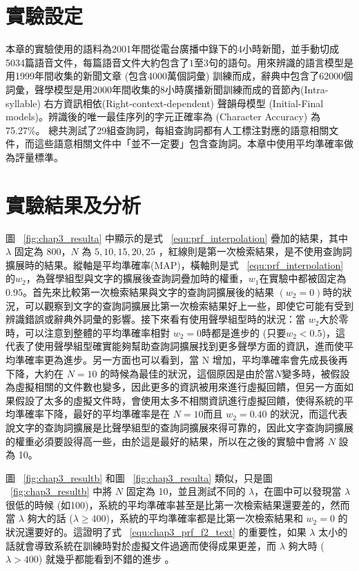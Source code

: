 \section{實驗設定}
\label{sec:chap3_exp_design} 
本章的實驗使用的語料為2001年間從電台廣播中錄下的4小時新聞，並手動切成5034篇語音文件，每篇語音文件大約包含了$1至3$句的語句。用來辨識的語言模型是用1999年間收集的新聞文章 (包含4000萬個詞彙) 訓練而成，辭典中包含了62000個詞彙，聲學模型是用2000年間收集的8小時廣播新聞訓練而成的音節內(Intra-syllable) 右方資訊相依(Right-context-dependent) 聲韻母模型 (Initial-Final models)。辨識後的唯一最佳序列的字元正確率為 (Character Accuracy) 為75.27\%。
總共測試了29組查詢詞，每組查詢詞都有人工標注對應的語意相關文件，而這些語意相關文件中「並不一定要」包含查詢詞。本章中使用平均準確率做為評量標準。

\section{實驗結果及分析}

圖 ~\ref{fig:chap3_resulta} 中顯示的是式 ~\ref{equ:prf_interpolation} 疊加的結果，其中 $\lambda$ 固定為 800，$N$ 為 $5, 10, 15, 20, 25$ ，紅線則是第一次檢索結果，是不使用查詢詞擴展時的結果。縱軸是平均準確率(MAP)，橫軸則是式 ~\ref{equ:prf_interpolation} 的$w_2$，為聲學組型與文字的擴展後查詢詞疊加時的權重，$w_1$在實驗中都被固定為 $0.95$。首先來比較第一次檢索結果與文字的查詢詞擴展後的結果 $(w_2 =
0)$時的狀況，可以觀察到文字的查詢詞擴展比第一次檢索結果好上一些，即使它可能有受到辨識錯誤或辭典外詞彙的影響。接下來看有使用聲學組型時的狀況：當 $w_2$大於零時，可以注意到整體的平均準確率相對 $w_2 = 0$時都是進步的 (只要$w_2 < 0.5$)，這代表了使用聲學組型確實能夠幫助查詢詞擴展找到更多聲學方面的資訊，進而使平均準確率更為進步。另一方面也可以看到，當 N 增加，平均準確率會先成長後再下降，大約在 $N=10$
的時候為最佳的狀況，這個原因是由於當$N$變多時，被假設為虛擬相關的文件數也變多，因此更多的資訊被用來進行虛擬回饋，但另一方面如果假設了太多的虛擬文件時，會使用太多不相關資訊進行虛擬回饋，使得系統的平均準確率下降，最好的平均準確率是在 $N=10$而且 $w_2 = 0.40$ 的狀況，而這代表說文字的查詢詞擴展是比聲學組型的查詢詞擴展來得可靠的，因此文字查詢詞擴展的權重必須要設得高一些，由於這是最好的結果，所以在之後的實驗中會將 $N$ 設為 10。

圖 ~\ref{fig:chap3_resultb} 和圖 ~\ref{fig:chap3_resulta} 類似，只是圖 ~\ref{fig:chap3_resultb} 中將 $N$ 固定為 10，並且測試不同的 $\lambda$，在圖中可以發現當 $\lambda$ 很低的時候 (如100)，系統的平均準確率甚至是比第一次檢索結果還要差的，然而當 $\lambda$ 夠大的話 ($\lambda \geq 400$)，系統的平均準確率都是比第一次檢索結果和 $w_2 = 0$ 的狀況還要好的。這證明了式 ~\ref{equ:chap3_prf_f2_text} 的重要性，如果 $\lambda$ 太小的話就會導致系統在訓練時對於虛擬文件過適而使得成果更差，而 $\lambda$ 夠大時 ($\lambda > 400$) 就幾乎都能看到不錯的進步 。  

